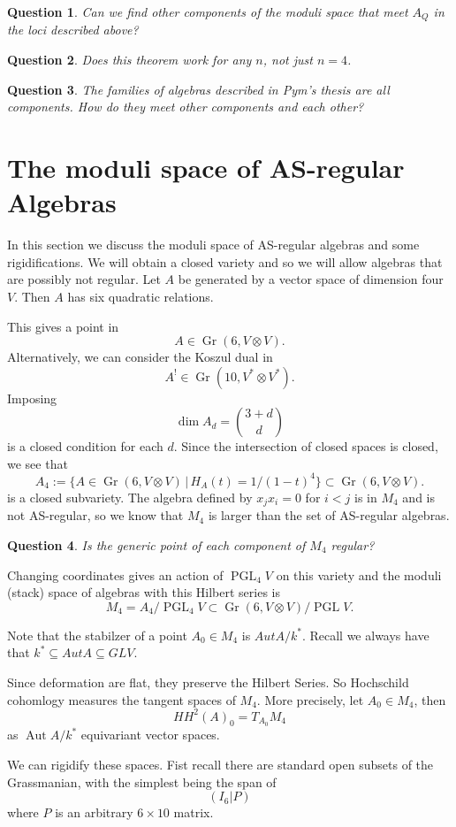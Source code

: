 \documentclass[12]{article}
\newtheorem{question}{Question}
\DeclareMathOperator{\PGL}{PGL}
\DeclareMathOperator{\Gr}{Gr}
\DeclareMathOperator{\Aut}{Aut}
\begin{document}
\begin{question}
Can we find other components of the moduli space that meet $A_Q$ in the loci described above?
\end{question}
\begin{question}
  Does this theorem work for any $n$, not just $n=4$.
\end{question}
\begin{question}
  The families of algebras described in Pym's thesis are all components.  How do they meet other components and each other?
\end{question}

\section{The moduli space of AS-regular Algebras}
In this section we discuss the moduli space of AS-regular algebras and some rigidifications. We will obtain a closed variety and so we will allow algebras that are possibly not regular.
Let $A$ be generated by a vector space of dimension four $V$.
Then $A$ has six quadratic relations.


This gives a point in
$$A \in \Gr(6, V\otimes V).$$  Alternatively, we can consider the Koszul dual in
$$A^! \in \Gr(10, V^*\otimes V^*).$$  Imposing
$$\dim A_d = \binom{3+d}{d}$$
is a closed condition for each $d$.  Since the intersection of closed spaces is closed, we see that
$$ A_4 := \{ A \in \Gr(6,V\otimes V) \,|\, H_A(t) = 1/(1-t)^4\}
\subset \Gr(6,V\otimes V).$$ is a closed subvariety.
The algebra defined by $x_jx_i = 0$ for $i<j$ is in $M_4$ and is not AS-regular, so we know that $M_4$ is larger than the set of AS-regular algebras.
\begin{question} Is the generic point of each component of $M_4$ regular?
  \end{question}
Changing coordinates gives an action of
$\PGL_4V$ on this variety and the moduli (stack) space
of algebras with this Hilbert series is
$$ M_4 = A_4/\PGL_4V \subset \Gr(6,V\otimes V)/\PGL V.$$

Note that the stabilzer of a point $A_0 \in M_4$ is $Aut A/k^*$.
Recall we always have that $k^{*} \subseteq Aut A \subseteq GL V.$

Since deformation are flat, they preserve the Hilbert Series.  So Hochschild cohomlogy measures the tangent spaces of $M_4$.  More precisely, let $A_0 \in M_4$,
then $$HH^2(A)_0 = T_{A_0} M_4$$ as $\Aut A/k^*$ equivariant vector spaces.

We can rigidify these spaces.  Fist recall there are standard open subsets of the Grassmanian, with the simplest being the span of 
$$( I_6 |P)$$ where
$P$ is an arbitrary $6 \times 10$ matrix.
\end{document}
